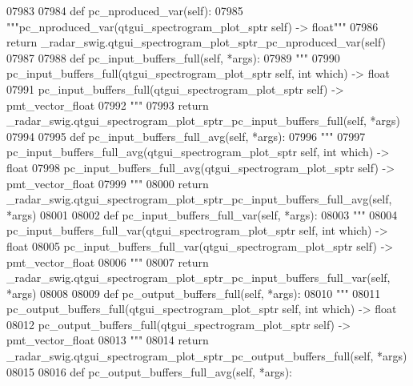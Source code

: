 \begin{DoxyCode}
{{{{{{{{{{{{{{{{{{{{{{{{{{07983 
07984     \textcolor{keyword}{def }pc_nproduced_var(self):
07985         \textcolor{stringliteral}{"""pc\_nproduced\_var(qtgui\_spectrogram\_plot\_sptr self) -> float"""}
07986         \textcolor{keywordflow}{return} \_radar\_swig.qtgui\_spectrogram\_plot\_sptr\_pc\_nproduced\_var(self)
07987 
07988     \textcolor{keyword}{def }pc_input_buffers_full(self, *args):
07989         \textcolor{stringliteral}{"""}
07990 \textcolor{stringliteral}{        pc\_input\_buffers\_full(qtgui\_spectrogram\_plot\_sptr self, int which) -> float}
07991 \textcolor{stringliteral}{        pc\_input\_buffers\_full(qtgui\_spectrogram\_plot\_sptr self) -> pmt\_vector\_float}
07992 \textcolor{stringliteral}{        """}
07993         \textcolor{keywordflow}{return} \_radar\_swig.qtgui\_spectrogram\_plot\_sptr\_pc\_input\_buffers\_full(self, *args)
07994 
07995     \textcolor{keyword}{def }pc_input_buffers_full_avg(self, *args):
07996         \textcolor{stringliteral}{"""}
07997 \textcolor{stringliteral}{        pc\_input\_buffers\_full\_avg(qtgui\_spectrogram\_plot\_sptr self, int which) -> float}
07998 \textcolor{stringliteral}{        pc\_input\_buffers\_full\_avg(qtgui\_spectrogram\_plot\_sptr self) -> pmt\_vector\_float}
07999 \textcolor{stringliteral}{        """}
08000         \textcolor{keywordflow}{return} \_radar\_swig.qtgui\_spectrogram\_plot\_sptr\_pc\_input\_buffers\_full\_avg(self, *args)
08001 
08002     \textcolor{keyword}{def }pc_input_buffers_full_var(self, *args):
08003         \textcolor{stringliteral}{"""}
08004 \textcolor{stringliteral}{        pc\_input\_buffers\_full\_var(qtgui\_spectrogram\_plot\_sptr self, int which) -> float}
08005 \textcolor{stringliteral}{        pc\_input\_buffers\_full\_var(qtgui\_spectrogram\_plot\_sptr self) -> pmt\_vector\_float}
08006 \textcolor{stringliteral}{        """}
08007         \textcolor{keywordflow}{return} \_radar\_swig.qtgui\_spectrogram\_plot\_sptr\_pc\_input\_buffers\_full\_var(self, *args)
08008 
08009     \textcolor{keyword}{def }pc_output_buffers_full(self, *args):
08010         \textcolor{stringliteral}{"""}
08011 \textcolor{stringliteral}{        pc\_output\_buffers\_full(qtgui\_spectrogram\_plot\_sptr self, int which) -> float}
08012 \textcolor{stringliteral}{        pc\_output\_buffers\_full(qtgui\_spectrogram\_plot\_sptr self) -> pmt\_vector\_float}
08013 \textcolor{stringliteral}{        """}
08014         \textcolor{keywordflow}{return} \_radar\_swig.qtgui\_spectrogram\_plot\_sptr\_pc\_output\_buffers\_full(self, *args)
08015 
08016     \textcolor{keyword}{def }pc_output_buffers_full_avg(self, *args):
}}}}}}}}}}}}}}}}}}}}}}}}}}
\end{DoxyCode}
